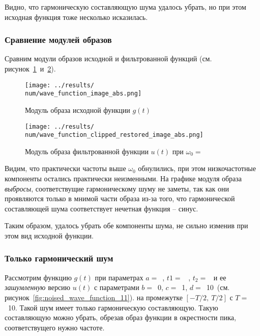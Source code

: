 Видно, что гармоническую составляющую шума удалось убрать, но при этом исходная функция тоже несколько исказилась. 

\FloatBarrier
\subsubsection{Сравнение модулей образов}
Сравним модули образов исходной и фильтрованной функций (см. рисунок~\ref{fig:wave_function_image_abs_\num}~и~\ref{fig:wave_function_clipped_restored_image_abs_\num}).

\begin{figure}[ht!]
    \centering
    \texttt{[image: ../results/\\num/wave\_function\_image\_abs.png]}
    \caption{Модуль образа исходной функции $g(t)$}
    \label{fig:wave_function_image_abs_\num}
\end{figure}

\begin{figure}[ht!]
    \centering
    \texttt{[image: ../results/\\num/wave\_function\_clipped\_restored\_image\_abs.png]}
    \caption{Модуль образа фильтрованной функции $u(t)$ при $\omega_0=$~\imageclip}
    \label{fig:wave_function_clipped_restored_image_abs_\num}
\end{figure}

Видим, что практически частоты выше $\omega_0$ обнулились, при этом низкочастотные компоненты остались практически неизменными. 
На графике модуля образа \textit{выбросы}, соответствущие гармоническому шуму не заметы, так как они проявляются только в 
мнимой части образа из-за того, что гармонической составляющей шума соответствует нечетная функция -- синус. 

\FloatBarrier
Таким образом, удалось убрать обе компоненты шума, не сильно изменив при этом вид исходной функции. 

\FloatBarrier
\subsubsection{Только гармонический шум}

\def\num{11}
\def\b{0}
\def\c{1}
\def\d{10}
\def\T{10}

Рассмотрим функцию $g(t)$ при параметрах $a=$~\a, $t1 =$~ \from, $t_2 =$~\to 
и ее \textit{зашумленную} версию $u(t)$ с параметрами $b =$~\b, $c =$~\c, $d =$~\d ~(см. рисунок~\ref{fig:noised_wave_function_\num}).
на промежутке $[-T/2,~T/2]$ с $T =$~\T.
Такой шум имеет только гармоническую составляющую. Такую составляющую можно убрать, обрезав образ функции в окрестности пика, соответствущего нужно частоте. 

